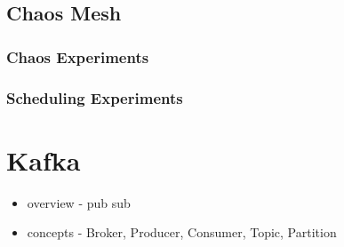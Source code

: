 \subsection{Chaos Mesh} \label{background-chaos-mesh}

\subsubsection{Chaos Experiments}

\subsubsection{Scheduling Experiments}

\section{Kafka} \label{background-kafka}

\begin{itemize}
	\item overview - pub sub
	\item concepts - Broker, Producer, Consumer, Topic, Partition
\end{itemize}

